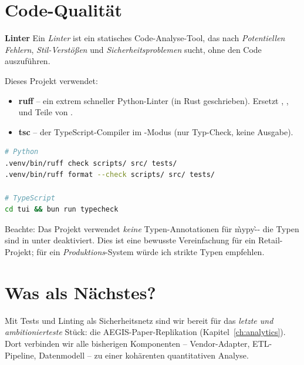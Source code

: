 \section{Code-Qualität}

\begin{definition}
\textbf{Linter}
Ein \emph{Linter} ist ein statisches Code-Analyse-Tool, das nach
\emph{Potentiellen Fehlern}, \emph{Stil-Verstößen} und
\emph{Sicherheitsproblemen} sucht, ohne den Code auszuführen.
\end{definition}

Dieses Projekt verwendet:

\begin{itemize}
  \item \textbf{ruff} -- ein extrem schneller Python-Linter
        (in Rust geschrieben). Ersetzt , ,
         und Teile von .
  \item \textbf{tsc} -- der TypeScript-Compiler im
        -Modus (nur Typ-Check, keine Ausgabe).
\end{itemize}

\begin{lstlisting}[language=bash, caption={Linter ausführen}]
# Python
.venv/bin/ruff check scripts/ src/ tests/
.venv/bin/ruff format --check scripts/ src/ tests/

# TypeScript
cd tui && bun run typecheck
\end{lstlisting}

\begin{warnung}
Beachte: Das Projekt verwendet \emph{keine} Typen-Annotationen für
\`mypy\` -- die Typen sind in  unter
 deaktiviert. Dies ist eine bewusste
Vereinfachung für ein Retail-Projekt; für ein
\emph{Produktions}-System würde ich strikte Typen empfehlen.
\end{warnung}

\section{Was als Nächstes?}

Mit Tests und Linting als Sicherheitsnetz sind wir bereit für das
\emph{letzte und ambitionierteste} Stück: die
AEGIS-Paper-Replikation (Kapitel~\ref{ch:analytics}). Dort
verbinden wir alle bisherigen Komponenten -- Vendor-Adapter,
ETL-Pipeline, Datenmodell -- zu einer kohärenten quantitativen
Analyse.
